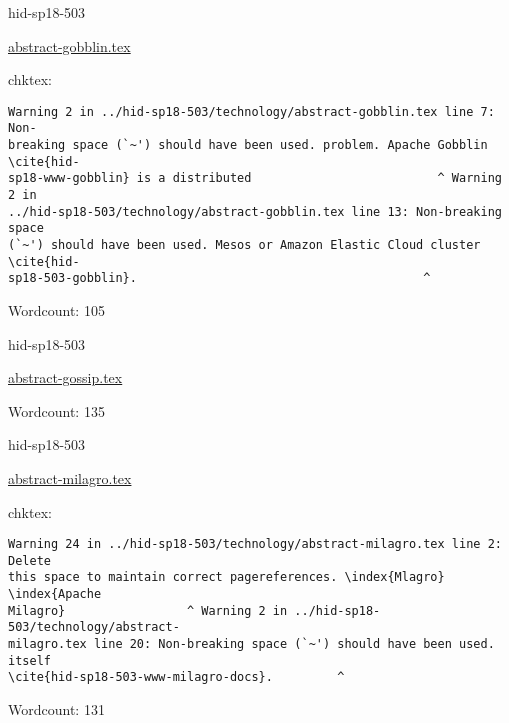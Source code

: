 

\begin{IU}

hid-sp18-503

\href{https://github.com/cloudmesh-community/hid-sp18-503/blob/master//technology/abstract-gobblin.tex}{abstract-gobblin.tex}

 
chktex:
\begin{tiny}
\begin{verbatim}
Warning 2 in ../hid-sp18-503/technology/abstract-gobblin.tex line 7: Non-
breaking space (`~') should have been used. problem. Apache Gobblin \cite{hid-
sp18-www-gobblin} is a distributed                          ^ Warning 2 in
../hid-sp18-503/technology/abstract-gobblin.tex line 13: Non-breaking space
(`~') should have been used. Mesos or Amazon Elastic Cloud cluster \cite{hid-
sp18-503-gobblin}.                                        ^
\end{verbatim}
\end{tiny}

Wordcount: 105

\end{IU}



\begin{IU}

hid-sp18-503

\href{https://github.com/cloudmesh-community/hid-sp18-503/blob/master//technology/abstract-gossip.tex}{abstract-gossip.tex}

 

Wordcount: 135

\end{IU}



\begin{IU}

hid-sp18-503

\href{https://github.com/cloudmesh-community/hid-sp18-503/blob/master//technology/abstract-milagro.tex}{abstract-milagro.tex}

 
chktex:
\begin{tiny}
\begin{verbatim}
Warning 24 in ../hid-sp18-503/technology/abstract-milagro.tex line 2: Delete
this space to maintain correct pagereferences. \index{Mlagro} \index{Apache
Milagro}                 ^ Warning 2 in ../hid-sp18-503/technology/abstract-
milagro.tex line 20: Non-breaking space (`~') should have been used. itself
\cite{hid-sp18-503-www-milagro-docs}.         ^
\end{verbatim}
\end{tiny}

Wordcount: 131

\end{IU}

